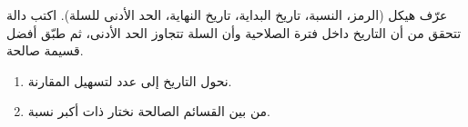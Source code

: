 \begin{statement}
عرّف هيكل  (الرمز، النسبة، تاريخ البداية، تاريخ النهاية، الحد الأدنى للسلة). اكتب دالة  تتحقق من أن التاريخ داخل فترة الصلاحية وأن السلة تتجاوز الحد الأدنى، ثم طبّق أفضل قسيمة صالحة.
\end{statement}
\begin{stepsbox}\begin{enumerate}
\item نحول التاريخ إلى عدد  لتسهيل المقارنة.
\item من بين القسائم الصالحة نختار ذات أكبر نسبة.
\end{enumerate}\end{stepsbox}
